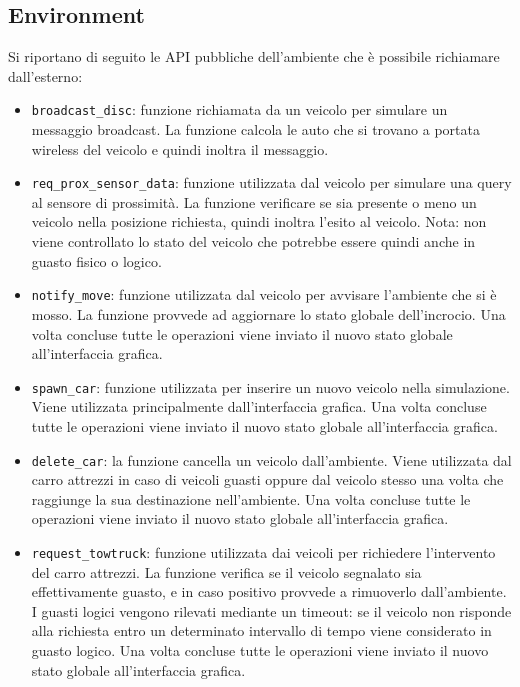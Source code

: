 \documentclass{memoir}
\begin{document}
\subsection{Environment}

Si riportano di seguito le API pubbliche dell'ambiente che è possibile
richiamare dall'esterno:
\begin{itemize}
\item \texttt{broadcast\_disc}: funzione richiamata da un veicolo per simulare
  un messaggio broadcast. La funzione calcola le auto che si trovano a portata
  wireless del veicolo e quindi inoltra il messaggio.
\item \texttt{req\_prox\_sensor\_data}: funzione utilizzata dal veicolo per
  simulare una query al sensore di prossimità. La funzione verificare se sia
  presente o meno un veicolo nella posizione richiesta, quindi inoltra l'esito
  al veicolo. Nota: non viene controllato lo stato del veicolo che potrebbe
  essere quindi anche in guasto fisico o logico.
\item \texttt{notify\_move}: funzione utilizzata dal veicolo per avvisare
  l'ambiente che si è mosso. La funzione provvede ad aggiornare lo stato globale
  dell’incrocio. Una volta concluse tutte le operazioni viene inviato il nuovo
  stato globale all’interfaccia grafica.
\item \texttt{spawn\_car}: funzione utilizzata per inserire un nuovo veicolo
  nella simulazione. Viene utilizzata principalmente dall'interfaccia grafica.
  Una volta concluse tutte le operazioni viene inviato il nuovo stato globale
  all’interfaccia grafica.
\item \texttt{delete\_car}: la funzione cancella un veicolo dall'ambiente. Viene
  utilizzata dal carro attrezzi in caso di veicoli guasti oppure dal veicolo
  stesso una volta che raggiunge la sua destinazione nell’ambiente. Una volta
  concluse tutte le operazioni viene inviato il nuovo stato globale
  all’interfaccia grafica.
\item \texttt{request\_towtruck}: funzione utilizzata dai veicoli per richiedere
  l'intervento del carro attrezzi. La funzione verifica se il veicolo segnalato
  sia effettivamente guasto, e in caso positivo provvede a rimuoverlo
  dall’ambiente. I guasti logici vengono rilevati mediante un timeout: se il
  veicolo non risponde alla richiesta entro un determinato intervallo di tempo
  viene considerato in guasto logico. Una volta concluse tutte le operazioni
  viene inviato il nuovo stato globale all’interfaccia grafica.
\end{itemize}
\end{document}
